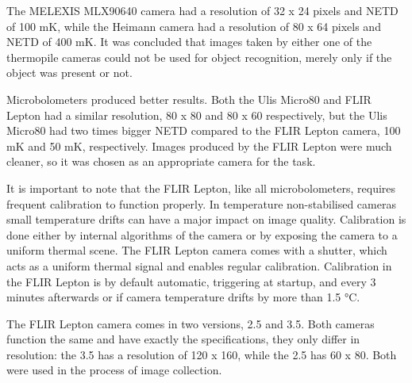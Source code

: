 The MELEXIS MLX90640 camera had a resolution of 32 x 24 pixels and NETD of 100 \si{\milli\kelvin}, while the Heimann camera had a resolution of 80 x 64 pixels and NETD of 400 \si{\milli\kelvin}.
It was concluded that images taken by either one of the thermopile cameras could not be used for object recognition, merely only if the object was present or not\cite{thermal_comparison}.

Microbolometers produced better results.
Both the Ulis Micro80 and FLIR Lepton had a similar resolution, 80 x 80 and 80 x 60 respectively, but the Ulis Micro80 had two times bigger NETD compared to the FLIR Lepton camera, 100 \si{\milli\kelvin} and 50 \si{\milli\kelvin}, respectively.
Images produced by the FLIR Lepton were much cleaner, so it was chosen as an appropriate camera for the task.

It is important to note that the FLIR Lepton, like all microbolometers, requires frequent calibration to function properly.
In temperature non-stabilised cameras small temperature drifts can have a major impact on image quality\cite{thermal_book}.
Calibration is done either by internal algorithms of the camera or by exposing the camera to a uniform thermal scene.
The FLIR Lepton camera comes with a shutter, which acts as a uniform thermal signal and enables regular calibration.
Calibration in the FLIR Lepton is by default automatic, triggering at startup, and every 3 minutes afterwards or if camera temperature drifts by more than 1.5 \si{\celsius}.

The FLIR Lepton camera comes in two versions, 2.5 and 3.5.
Both cameras function the same and have exactly the specifications, they only differ in resolution: the 3.5 has a resolution of 120 x 160, while the 2.5 has 60 x 80.
Both were used in the process of image collection.
